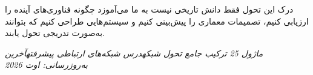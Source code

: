 درک این تحول فقط دانش تاریخی نیست  به ما می‌آموزد چگونه فناوری‌های آینده را ارزیابی کنیم، تصمیمات معماری را پیش‌بینی کنیم و سیستم‌هایی طراحی کنیم که بتوانند به‌صورت تدریجی تحول یابند.

\emph{ماژول 25  ترکیب جامع تحول شبکه}\CNbr{}\emph{درس شبکه‌های ارتباطی پیشرفته}\CNbr{}\emph{آخرین به‌روزرسانی: اوت 2026}
